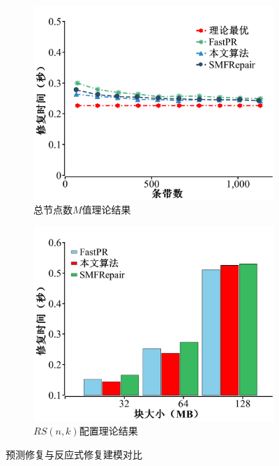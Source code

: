 \begin{figure}[htbp]
	\centering
	\begin{subfigure}[t]{0.4\textwidth}
		\centering
		\includegraphics[width=1.0\linewidth]{figures/3-12.pdf}
		\caption{总节点数$M$值理论结果}
		\label{fig:3-12}
	\end{subfigure}
	\begin{subfigure}[t]{0.4\textwidth}
		\centering
		\includegraphics[width=1.1\linewidth]{figures/3-14.pdf}
		\caption{$RS(n,k)$配置理论结果}
		\label{fig:3-14}
	\end{subfigure}
	\caption{预测修复与反应式修复建模对比}
	\label{fig:3-12-14}
\end{figure}

